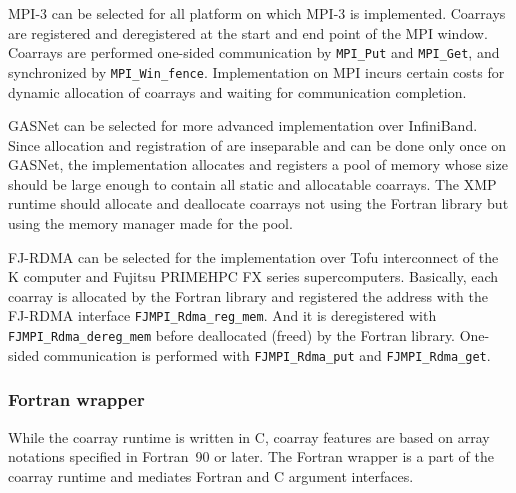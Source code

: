 MPI-3 can be selected for all platform on which MPI-3 is implemented. Coarrays are 
registered and deregistered at the start and end point of the MPI window. 
Coarrays are performed one-sided communication by {\tt MPI\_Put} and {\tt MPI\_Get},
and synchronized by {\tt MPI\_Win\_fence}. 
Implementation on MPI incurs certain costs for dynamic allocation of coarrays and 
waiting for communication completion.

GASNet can be selected for more advanced implementation over InfiniBand. 
Since allocation and registration of are inseparable and can be done only once 
on GASNet, the implementation allocates and registers a pool of memory
whose size should be large enough to contain all static and allocatable coarrays.
The XMP runtime should allocate and deallocate coarrays not using the Fortran 
library but using the memory manager made for the pool.

FJ-RDMA can be selected for the implementation over Tofu interconnect of 
the K computer and Fujitsu PRIMEHPC FX series supercomputers. 
Basically, each coarray is allocated by the Fortran library and registered 
the address with the FJ-RDMA interface {\tt FJMPI\_Rdma\_reg\_mem}. 
And it is deregistered with {\tt FJMPI\_Rdma\_dereg\_mem} before deallocated 
(freed) by the Fortran library. 
One-sided communication is performed with {\tt FJMPI\_Rdma\_put} and 
{\tt FJMPI\_Rdma\_get}.


\subsubsection{Fortran wrapper}

While the coarray runtime is written in C, coarray features are 
based on array notations specified in Fortran~90 or later.
The Fortran wrapper is a part of the coarray runtime and mediates
Fortran and C argument interfaces.

